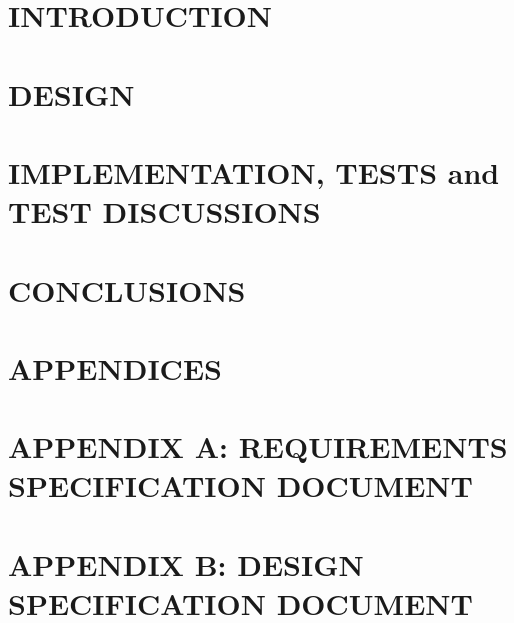 \documentclass[final,12pt,a4paper]{COMP4910}
\begin{document}
	\chapter{INTRODUCTION}\label{ch:Introduction}
	

	\chapter{DESIGN}\label{ch:Design}
	

	\chapter{IMPLEMENTATION, TESTS and TEST DISCUSSIONS}\label{ch:Implementation}
	

	\chapter{CONCLUSIONS}\label{ch:Conclusion}
	

	\cite{*} %
	\backmatter{}
	

	\appendix\chapter{APPENDICES}
	

	\appendix\chapter{APPENDIX A: REQUIREMENTS SPECIFICATION DOCUMENT}
	

	\appendix\chapter{APPENDIX B: DESIGN SPECIFICATION DOCUMENT}
	
\end{document}
